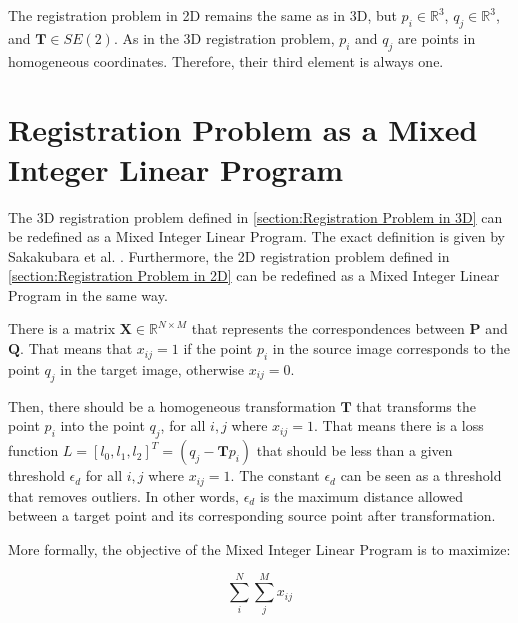         The registration problem in 2D remains the same as in 3D, but $p_i \in \mathbb{R}^{3}$, $q_j \in \mathbb {R}^{3}$, and $\pmb{T} \in SE(2)$.
        As in the 3D registration problem, $p_i$ and $q_j$ are points in homogeneous coordinates. Therefore, their third element is always one.

    \section{Registration Problem as a Mixed Integer Linear Program}
    \label{section:Registration Problem as Mixed Integer Linear Program}
        The 3D registration problem defined in \autoref{section:Registration Problem in 3D} can be redefined as a Mixed Integer Linear Program.
        The exact definition is given by Sakakubara et al. \cite{Sakakubara_2007_automatic}. Furthermore, the 2D registration problem defined in \autoref{section:Registration Problem in 2D}
        can be redefined as a Mixed Integer Linear Program in the same way.
        
        There is a matrix $\pmb{X} \in \mathbb{R}^{N \times M}$ that represents the correspondences between $\pmb{P}$ and $\pmb{Q}$.
        That means that $x_{ij} = 1$ if the point $p_i$ in the source image corresponds to the point $q_j$ in the target image, otherwise $x_{ij} = 0$.

        Then, there should be a homogeneous transformation $\pmb{T}$ that transforms the point $p_i$ into the point $q_j$, for all $i, j$ where $x_{ij} = 1$.
        That means there is a loss function $L = [l_0, l_1, l_2]^T = (q_j - \pmb{T} p_i)$ that should be less than a given threshold $\epsilon_d$
        for all $i, j$ where $x_{ij} = 1$. The constant $\epsilon_d$ can be seen as a threshold that removes outliers.
        In other words, $\epsilon_d$ is the maximum distance allowed between a target point and its corresponding source point after transformation.

        More formally, the objective of the Mixed Integer Linear Program is to maximize:
        
        \begin{equation}
            \label{eq:objective_original}
            \sum_{i}^{N} \sum_{j}^{M} x_{ij}    
        \end{equation}
        
